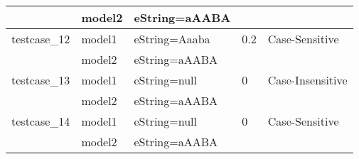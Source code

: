 \documentclass[a4paper]{article}
\begin{document}
\begin{longtable}{|l|l|l|l|l|}
\hline
             & model2 & eString=aAABA & &\\
\hline
\hline
testcase\_12 & model1 & eString=Aaaba & 0.2 & Case-Sensitive\\
\hline
             & model2 & eString=aAABA & &\\
\hline
\hline
testcase\_13 & model1 & eString=null & 0 & Case-Insensitive\\
\hline
             & model2 & eString=aAABA & &\\
\hline
\hline
testcase\_14 & model1 & eString=null & 0 & Case-Sensitive\\
\hline
                      & model2 & eString=aAABA & &\\
\hline

\end{longtable}
\end{document}
